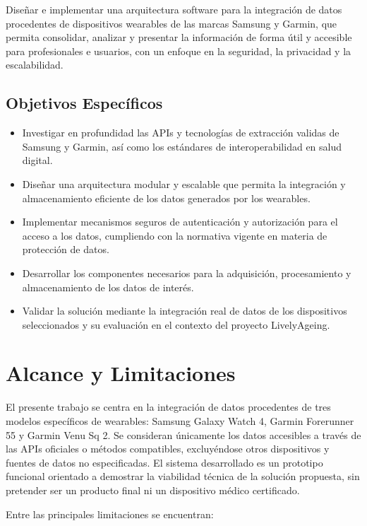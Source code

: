 Diseñar e implementar una arquitectura software para la integración de datos procedentes de dispositivos wearables de las marcas Samsung y Garmin, que permita consolidar, analizar y presentar la información de forma útil y accesible para profesionales e usuarios, con un enfoque en la seguridad, la privacidad y la escalabilidad.

\subsection{Objetivos Específicos}

\begin{itemize}
    \item Investigar en profundidad las APIs y tecnologías de extracción validas de Samsung y Garmin, así como los estándares de interoperabilidad en salud digital.
    \item Diseñar una arquitectura modular y escalable que permita la integración y almacenamiento eficiente de los datos generados por los wearables.
    \item Implementar mecanismos seguros de autenticación y autorización para el acceso a los datos, cumpliendo con la normativa vigente en materia de protección de datos.
    \item Desarrollar los componentes necesarios para la adquisición, procesamiento y almacenamiento de los datos de interés.
    \item Validar la solución mediante la integración real de datos de los dispositivos seleccionados y su evaluación en el contexto del proyecto LivelyAgeing.
\end{itemize}

\section{Alcance y Limitaciones}

El presente trabajo se centra en la integración de datos procedentes de tres modelos específicos de wearables: Samsung Galaxy Watch 4, Garmin Forerunner 55 y Garmin Venu Sq 2. Se consideran únicamente los datos accesibles a través de las APIs oficiales o métodos compatibles, excluyéndose otros dispositivos y fuentes de datos no especificadas. El sistema desarrollado es un prototipo funcional orientado a demostrar la viabilidad técnica de la solución propuesta, sin pretender ser un producto final ni un dispositivo médico certificado.

Entre las principales limitaciones se encuentran:

